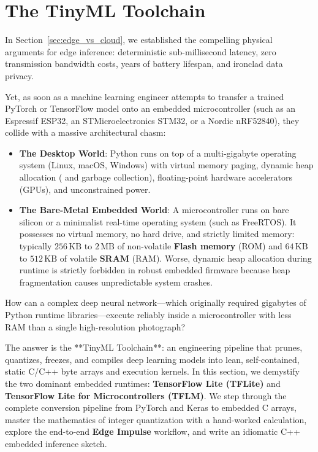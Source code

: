 \section{The TinyML Toolchain}\label{sec:tinyml_toolchain}

In Section~\ref{sec:edge_vs_cloud}, we established the compelling physical arguments for edge inference: deterministic sub-millisecond latency, zero transmission bandwidth costs, years of battery lifespan, and ironclad data privacy.

Yet, as soon as a machine learning engineer attempts to transfer a trained PyTorch or TensorFlow model onto an embedded microcontroller (such as an Espressif ESP32, an STMicroelectronics STM32, or a Nordic nRF52840), they collide with a massive architectural chasm:
\begin{itemize}
    \item \textbf{The Desktop World}: Python runs on top of a multi-gigabyte operating system (Linux, macOS, Windows) with virtual memory paging, dynamic heap allocation ( and garbage collection), floating-point hardware accelerators (GPUs), and unconstrained power.
    \item \textbf{The Bare-Metal Embedded World}: A microcontroller runs on bare silicon or a minimalist real-time operating system (such as FreeRTOS). It possesses no virtual memory, no hard drive, and strictly limited memory: typically $256\,\text{KB}$ to $2\,\text{MB}$ of non-volatile \textbf{Flash memory} (ROM) and $64\,\text{KB}$ to $512\,\text{KB}$ of volatile \textbf{SRAM} (RAM). Worse, dynamic heap allocation during runtime is strictly forbidden in robust embedded firmware because heap fragmentation causes unpredictable system crashes.
\end{itemize}

How can a complex deep neural network---which originally required gigabytes of Python runtime libraries---execute reliably inside a microcontroller with less RAM than a single high-resolution photograph?

The answer is the **TinyML Toolchain**: an engineering pipeline that prunes, quantizes, freezes, and compiles deep learning models into lean, self-contained, static C/C++ byte arrays and execution kernels. In this section, we demystify the two dominant embedded runtimes: \textbf{TensorFlow Lite (TFLite)} and \textbf{TensorFlow Lite for Microcontrollers (TFLM)}. We step through the complete conversion pipeline from PyTorch and Keras to embedded C arrays, master the mathematics of integer quantization with a hand-worked calculation, explore the end-to-end \textbf{Edge Impulse} workflow, and write an idiomatic C++ embedded inference sketch.

